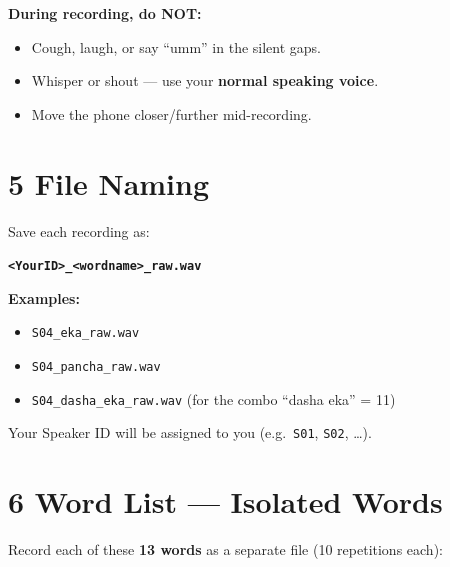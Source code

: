 \documentclass[11pt,a4paper]{article}
\begin{document}
\begin{warnbox}
\textbf{During recording, do NOT:}
\begin{itemize}[leftmargin=1.2em, itemsep=2pt]
  \item Cough, laugh, or say ``umm'' in the silent gaps.
  \item Whisper or shout --- use your \textbf{normal speaking voice}.
  \item Move the phone closer/further mid-recording.
\end{itemize}
\end{warnbox}

\section*{5 \quad File Naming}

Save each recording as:
\begin{center}
  \texttt{\textbf{<YourID>\_<wordname>\_raw.wav}}
\end{center}

\noindent\textbf{Examples:}
\begin{itemize}[leftmargin=1.2em, itemsep=2pt]
  \item \texttt{S04\_eka\_raw.wav}
  \item \texttt{S04\_pancha\_raw.wav}
  \item \texttt{S04\_dasha\_eka\_raw.wav} \quad (for the combo ``dasha eka'' = 11)
\end{itemize}

Your Speaker ID will be assigned to you (e.g.\ \texttt{S01}, \texttt{S02}, \ldots).

\section*{6 \quad Word List --- Isolated Words}

Record each of these \textbf{13 words} as a separate file (10 repetitions each):
\end{document}
